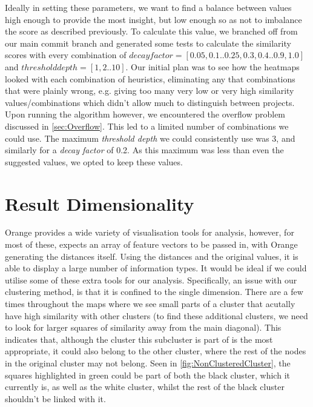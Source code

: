 Ideally in setting these parameters, we want to find a balance between values
high enough to provide the most insight, but low enough so as not to imbalance
the score as described previously. To calculate this value, we branched off
from our main commit branch and generated some tests to calculate the similarity
scores with every combination of $decay factor=[0.05, 0.1 .. 0.25, 0.3, 0.4 .. 0.9, 1.0]$
and $threshold depth=[1, 2 .. 10]$. Our initial plan was to see how the heatmaps
looked with each combination of heuristics, eliminating any that combinations
that were plainly wrong, e.g. giving too many very low or very high similarity
values/combinations which didn't allow much to distinguish between projects.
Upon running the algorithm however, we encountered the overflow problem discussed
in \cref{sec:Overflow}. This led to a limited number of combinations we could use.
The maximum \emph{threshold depth} we could consistently use was 3, and similarly for
a \emph{decay factor} of 0.2. As this maximum was less than even the suggested values,
we opted to keep these values.

\section{Result Dimensionality}
\label{sec:VisTech}
Orange provides a wide variety of visualisation tools for analysis, however,
for most of these, expects an array of feature vectors to be passed in, with
Orange generating the distances itself. Using the distances and the original
values, it is able to display a large number of information types. It would be
ideal if we could utilise some of these extra tools for our analysis. Specifically,
an issue with our clustering method, is that it is confined to the single dimension.
There are a few times throughout the maps where we see small parts of a cluster
that acutally have high similarity with other clusters (to find these 
additional clusters, we need to look for larger squares of similarity away from
the main diagonal). This indicates that, although the cluster this subcluster
is part of is the most appropriate, it could also belong to the other cluster,
where the rest of the nodes in the original cluster may not belong. Seen in
\cref{fig:NonClusteredCluster}, the squares highlighted in green could be part
of both the black cluster, which it currently is, as well as the white cluster,
whilst the rest of the black cluster shouldn't be linked with it. 

